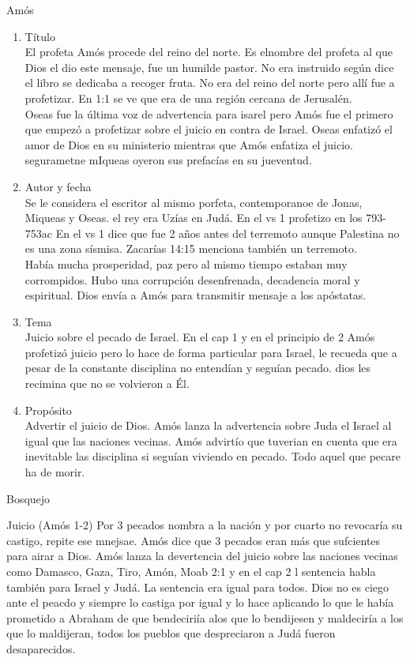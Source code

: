 \documentclass[12pt]{article}
\begin{document}
\begin{section}{Amós}
	\begin{enumerate}
		\item Título\\
			El profeta Amós procede del reino del norte. Es elnombre del profeta al que Dios el dio este mensaje, fue un humilde pastor. No era instruido según dice el libro se dedicaba a recoger fruta. No era del reino del norte pero allí fue a profetizar. En 1:1 se ve que era de una región cercana de Jerusalén.\\
			Oseas fue la última voz de advertencia para isarel pero Amós fue el primero que empezó a profetizar sobre el juicio en contra de Israel. Oseas enfatizó el amor de Dios en su ministerio mientras que Amós enfatiza el juicio. segurametne mIqueas oyeron sus prefacías en su jueventud.
		\item Autor y fecha\\
			Se le considera el escritor al mismo porfeta, contemporanoe de Jonas, Miqueas y Oseas. el rey era Uzías en Judá. En el vs 1 profetizo en los 793-753ac En el vs 1 dice que fue 2 años antes del terremoto aunque Palestina no es una zona sísmisa. Zacarías 14:15 menciona también un terremoto.\\
			Había mucha prosperidad, paz pero al mismo tiempo estaban muy corrompidos. Hubo una corrupción desenfrenada, decadencia moral y espiritual. Dios envía a Amós para transmitir mensaje a los apóstatas.
		\item Tema\\
			Juicio sobre el pecado de Israel. En el cap 1 y en el principio de 2 Amós profetizó juicio pero lo hace de forma particular para Israel, le recueda que a pesar de la constante disciplina no entendían y seguían pecado. dios les recimina que no se volvieron a Él.
		\item Propósito\\
			Advertir el juicio de Dios. Amós lanza la advertencia sobre Juda el Israel al igual que las naciones vecinas. Amós advirtío que tuverian en cuenta que era inevitable las disciplina si seguían viviendo en pecado. Todo aquel que pecare ha de morir.
	\end{enumerate}
	\begin{subsection}{Bosquejo}
		\begin{subsubsection}{Juicio (Amós 1-2)}
			Por 3 pecados nombra a la nación y por cuarto no revocaría su castigo, repite ese mnejsae. Amós dice que 3 pecados eran más que sufcientes para airar a Dios. Amós lanza la devertencia del juicio sobre las naciones vecinas como Damasco, Gaza, Tiro, Amón, Moab 2:1 y en el cap 2 l sentencia habla también para Israel y Judá. La sentencia era igual para todos. Dios no es ciego ante el peacdo y siempre lo castiga por igual y lo hace aplicando lo que le había prometido a Abraham de que bendeciriía alos que lo bendijesen y maldeciría a los que lo maldijeran, todos los pueblos que despreciaron a Judá fueron desaparecidos.

\end{subsubsection}
\end{subsection}
\end{section}
\end{document}
